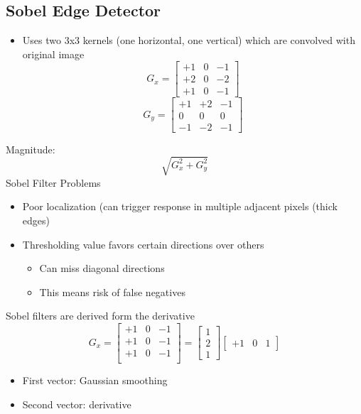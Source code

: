 \subsection{Sobel Edge Detector}
\begin{itemize}
    \item Uses two 3x3 kernels (one horizontal, one vertical) which are convolved with original image
    \[G_x = \begin{bmatrix}
        +1&0&-1\\
        +2&0&-2\\
        +1&0&-1
    \end{bmatrix}\]
    \[G_y = \begin{bmatrix}
        +1&+2&-1\\
        0&0&0\\
        -1&-2&-1
    \end{bmatrix}\]
\end{itemize}
Magnitude:
\[\sqrt{G_x^2 + G_y^2}\]
Sobel Filter Problems
\begin{itemize}
    \item Poor localization (can trigger response in multiple adjacent pixels (thick edges)
    \item Thresholding value favors certain directions over others
    \begin{itemize}
        \item Can miss diagonal directions
        \item This means risk of false negatives
    \end{itemize}
\end{itemize}
Sobel filters are derived form the derivative
\[G_x = \begin{bmatrix}
    +1&0&-1\\
    +1&0&-1\\
    +1&0&-1\\
\end{bmatrix} = \begin{bmatrix}
    1\\2\\1
\end{bmatrix}\begin{bmatrix}
    +1&0&1
\end{bmatrix}\]
\begin{itemize}
    \item First vector: Gaussian smoothing
    \item Second vector: derivative
\end{itemize}


